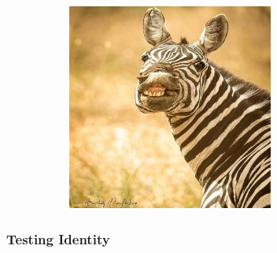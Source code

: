 \documentclass[12pt, fleqn, titlepage]{article}
\newcommand\skipper{1.4pt}
\begin{document}
\begin{figure}[H]
\begin{subfigure}[b]{0.8\textwidth}
		\hskip\skipper
		\includegraphics[width=0.15\linewidth]{imgs/temp_zebra}
	\end{subfigure}
\end{figure}

\subsubsection{Testing Identity}
\end{document}
